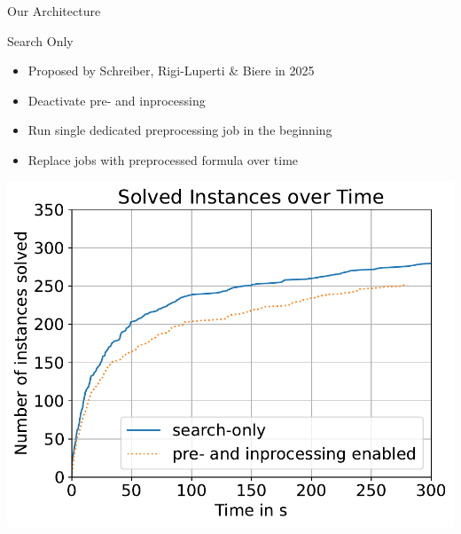 \documentclass{beamer}
\begin{document}
\begin{frame}{Our Architecture}
    \begin{minipage}{0.45\textwidth}
        \center
        \begin{block}{Search Only}
            \begin{itemize}
                \item Proposed by Schreiber, Rigi-Luperti \& Biere in 2025
                \item Deactivate pre- and inprocessing
                \item Run single dedicated preprocessing job in the beginning
                \item Replace jobs with preprocessed formula over time
            \end{itemize}
        \end{block}
    \end{minipage}%
    \hfill
    \begin{minipage}{0.45\textwidth}
        \center
        \includegraphics[scale=.35]{plots/config_compare/search_only_compare.pdf}
    \end{minipage}%

\end{frame}

\end{document}
